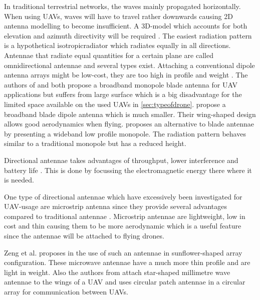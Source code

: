 In traditional terrestrial networks,
the waves mainly propagated horizontally. When using \gls{UAV}s, waves will have to travel rather downwards 
causing 2D antenna modelling to become insufficient. A 3D-model which accounts for both elevation and azimuth directivity 
will be required \cite{U12}.
The easiest radiation pattern is a hypothetical  \gls{isotropicradiator} which radiates equally in all directions.
Antennae that radiate equal quantities for a certain plane  are called omnidirectional antennae \cite{U12} and several types 
exist.
Attaching a conventional dipole antenna arrays might be low-cost, they are too high in profile and weight \cite{A6}.
The authors of \cite{A9} and \cite{A11} both propose a broadband monopole blade antenna for \gls{UAV} applications but
suffers from large surface which is a big disadvantage for the limited space available on the used \gls{UAV}s in \ref{sec:typeofdrone}.
\cite{A10, A4} propose a broadband blade dipole antenna which is much smaller. Their wing-shaped design 
allows good aerodynamics when flying.
\cite{A12} proposes an alternative to blade 
antennae by presenting a wideband low profile monopole. The radiation pattern behaves similar to a traditional monopole but has 
a reduced height.



Directional antennae takes advantages of throughput, lower interference and battery life \cite{A7}. This is done by focussing the 
electromagnetic energy there where it is needed.

One type of directional antennae which have excessively been investigated for \gls{UAV}-usage are microstrip antenna
since they provide several advantages compared to traditional antennae \cite{J13_microstripadvantages, J14_antennadesign}. Microstrip antennae
are lightweight, low in cost and thin causing them to be more aerodynamic which is a useful feature since the antennae will be attached
to flying drones.

Zeng et al. proposes in \cite{A6} the use of such an antennae in sunflower-shaped array configuration. These microwave antennae
have a much more thin profile and are light in weight.
Also the authors from \cite{A5} attach star-shaped millimetre wave antennae to the wings of a \gls{UAV} and
\cite{A8} uses circular patch antennae in a circular array for communication between \gls{UAV}s.

